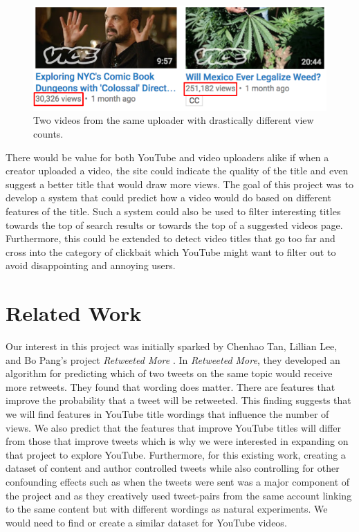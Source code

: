 \documentclass[a4paper,12pt]{article}
\begin{document}
\begin{figure}[h]
    \centering
    \includegraphics[width=.7\textwidth]{motivation}
    \caption{Two videos from the same uploader with drastically different view counts.}
    \label{fig:motivation}
\end{figure}

There would be value for both YouTube and video uploaders alike if when a creator uploaded a video, the site could indicate the quality of the title and even suggest a better title that would draw more views. The goal of this project was to develop a system that could predict how a video would do based on different features of the title. Such a system could also be used to filter interesting titles towards the top of search results or towards the top of a suggested videos page. Furthermore, this could be extended to detect video titles that go too far and cross into the category of clickbait which YouTube might want to filter out to avoid disappointing and annoying users.

\section{Related Work}
Our interest in this project was initially sparked by Chenhao Tan, Lillian Lee, and Bo Pang's project \textit{Retweeted More} \cite{tan+lee+pang:14}. In \textit{Retweeted More}, they developed an algorithm for predicting which of two tweets on the same topic would receive more retweets. They found that wording does matter. There are features that improve the probability that a tweet will be retweeted. This finding suggests that we will find features in YouTube title wordings that influence the number of views. We also predict that the features that improve YouTube titles will differ from those that improve tweets which is why we were interested in expanding on that project to explore YouTube. Furthermore, for this existing work, creating a dataset of content and author controlled tweets while also controlling for other confounding effects such as when the tweets were sent was a major component of the project and as they creatively used tweet-pairs from the same account linking to the same content but with different wordings as natural experiments. We would need to find or create a similar dataset for YouTube videos. \\
\end{document}
